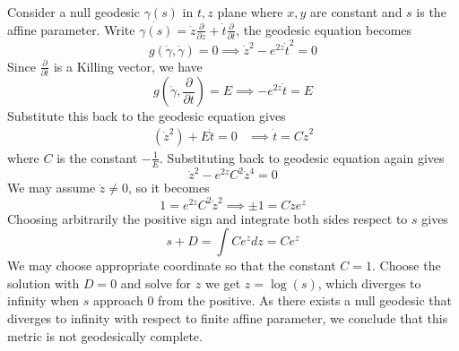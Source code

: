 \documentclass{article}
\theoremstyle{definition}
\theoremstyle{definition}
\theoremstyle{remark}
\begin{document}
Consider a null geodesic $\gamma(s)$ in $t,z$ plane where $x,y$ are constant and $s$ is the affine parameter.
Write $\dot{\gamma(s)} = \dot{z} \frac{\partial}{\partial z} + \dot{t} \frac{\partial}{\partial t}$, the geodesic equation becomes 
$$
g(\dot{\gamma}, \dot{\gamma}) = 0 \implies \dot{z}^2 - e^{2z} \dot{t}^2 = 0
$$
Since $\frac{\partial }{\partial t}$ is a Killing vector, we have 
$$
g(\dot{\gamma}, \frac{\partial}{\partial t}) = E \implies -e^{2z} \dot{t} =E
$$
Substitute this back to the geodesic equation gives
\begin{align*}
	(\dot{z}^2) + E \dot{t} = 0 
	& \implies \dot{t} = C \dot{z}^2
\end{align*}
where $C$ is the constant $-\frac{1}{E}$.
Substituting back to geodesic equation again gives 
$$
\dot{z}^2 - e^{2z} C^2 \dot{z}^4 = 0 
$$
We may assume $\dot{z} \neq 0$, so it becomes
$$
1 = e^{2z} C^2 \dot{z}^2 \implies \pm 1 = C \dot{z} e^{z}
$$
Choosing arbitrarily the positive sign and integrate both sides respect to $s$ gives 
$$
	s + D = \int C e^{z} dz = C e^{z}
$$
We may choose appropriate coordinate so that the constant $C = 1$. 
Choose the solution with $D = 0$ and solve for $z$ we get $z = \log(s)$, which diverges to infinity when $s$ approach $0$ from the positive.
As there exists a null geodesic that diverges to infinity with respect to finite affine parameter, we conclude that this metric is not geodesically complete.
\end{document}
